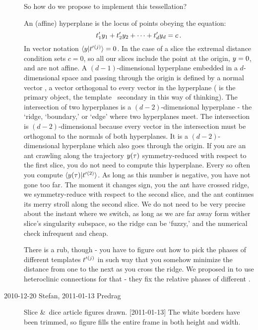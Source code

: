 \begin{description}
So how do we propose to implement this tessellation?



An (affine) hyperplane is the locus of points obeying the equation:
\[
t'_{1}y_1 + t'_{2}y_2 + \cdots + t'_{d}y_d = c
\,.
\]
In vector notation $\braket{\sspRed}{\sliceTan{}{}^{(j)}}=0$. In the case
of a slice the extremal distance condition sets $c=0$, so all our slices
include the point at the origin, $y=0$, and are not affine. A
$(d\!-\!1)$-dimensional hyperplane embedded in a $d$-dimensional space
and passing through the origin is defined by a normal vector \sliceTan{},
a vector orthogonal to every vector in the hyperplane (\sliceTan{} is the
primary object, the template \slicep\ secondary in this way of thinking).
The intersection of two hyperplanes is a $(d\!-\!2)$-dimensional
hyperplane - the `ridge, `boundary,' or `edge' where two hyperplanes
meet. The intersection is $(d\!-\!2)$-dimensional because every vector in
the intersection must be orthogonal to the normals of both hyperplanes.
It is a $(d\!-\!2)$-dimensional hyperplane which also goes through the
origin. If you are an ant crawling along the trajectory $y(\tau)$
symmetry-reduced with respect to the first slice, you do not need to
compute this hyperplane. Every so often you compute
$\braket{\sspRed(\tau)}{\sliceTan{}{}^{(2)}}$. As long as this number is
negative, you have not gone too far. The moment it changes sign, you the
ant have crossed ridge, we symmetry-reduce with respect to the second
slice, and the ant continues its merry stroll along the second slice. We
do not need to be very precise about the instant where we switch, as long
as we are far away form wither slice's singularity subspace, so the ridge
can be `fuzzy,' and the numerical check infrequent and cheap.

There is a rub, though - you have to figure out how to pick the phases of
different templates $t'_{}{}^{(j)}$ in such way that you somehow
minimize the distance from one to the next as you cross the ridge. We
proposed in  to use heteroclinic connections for that - they
fix the relative phases of different \eqva.

\item[2010-12-20 Stefan, 2011-01-13 Predrag]
Slice \&\ dice article figures drawn. [2011-01-13] The white borders have
been trimmed, so figure fills the entire frame in both height and width.


\end{description}
